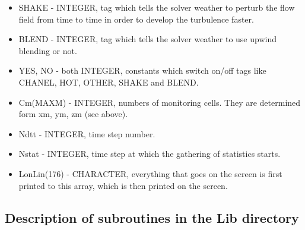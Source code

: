 \documentclass[10pt]{article}
\newcommand*{\tc}{\ttfamily} %
\begin{document}
\begin{itemize}
    \item
    {\tc SHAKE} - INTEGER, tag which tells the solver weather to perturb
      the flow field from time to time in order to develop the 
      turbulence faster.

    \item
    {\tc BLEND} - INTEGER, tag which tells the solver weather to use
       upwind blending or not.

    \item
    {\tc YES, NO} - both INTEGER, constants which switch on/off tags like
       {\tc CHANEL}, {\tc HOT}, {\tc OTHER}, {\tc SHAKE} and {\tc BLEND}.

    \item
    {\tc Cm(MAXM)} - INTEGER, numbers of monitoring cells. They are determined 
      form {\tc xm}, {\tc ym}, {\tc zm} (see above). 

    \item
    {\tc Ndtt} - INTEGER, time step number.

    \item
    {\tc Nstat} - INTEGER, time step at which the gathering of statistics
      starts.

    \item
    {\tc LonLin(176)} - CHARACTER, everything that goes on the screen is
      first printed to this array, which is then printed on the screen.

    \end{itemize}

    \subsection{Description of subroutines in the {\tc Lib} directory}
\end{document}
